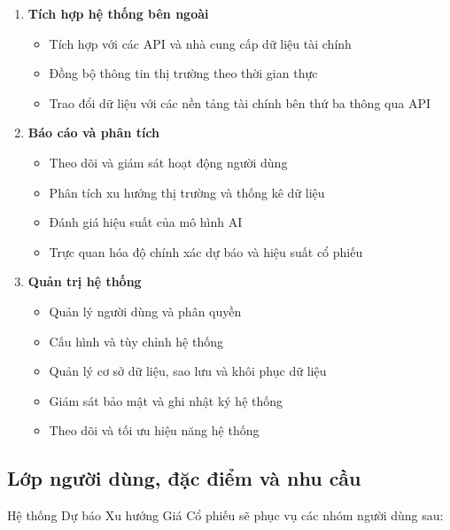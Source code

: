 \documentclass[12pt, a4paper]{article}
\begin{document}
\begin{enumerate}[label=\arabic*), leftmargin=0pt, itemindent=2em]
    \item \textbf{Tích hợp hệ thống bên ngoài}
          \begin{itemize}[leftmargin=2.5em]
              \item Tích hợp với các API và nhà cung cấp dữ liệu tài chính
              \item Đồng bộ thông tin thị trường theo thời gian thực
              \item Trao đổi dữ liệu với các nền tảng tài chính bên thứ ba thông qua API
          \end{itemize}

    \item \textbf{Báo cáo và phân tích}
          \begin{itemize}[leftmargin=2.5em]
              \item Theo dõi và giám sát hoạt động người dùng
              \item Phân tích xu hướng thị trường và thống kê dữ liệu
              \item Đánh giá hiệu suất của mô hình AI
              \item Trực quan hóa độ chính xác dự báo và hiệu suất cổ phiếu
          \end{itemize}

    \item \textbf{Quản trị hệ thống}
          \begin{itemize}[leftmargin=2.5em]
              \item Quản lý người dùng và phân quyền
              \item Cấu hình và tùy chỉnh hệ thống
              \item Quản lý cơ sở dữ liệu, sao lưu và khôi phục dữ liệu
              \item Giám sát bảo mật và ghi nhật ký hệ thống
              \item Theo dõi và tối ưu hiệu năng hệ thống
          \end{itemize}

\end{enumerate}

\subsection{Lớp người dùng, đặc điểm và nhu cầu}

Hệ thống Dự báo Xu hướng Giá Cổ phiếu sẽ phục vụ các nhóm người dùng sau:
\end{document}
